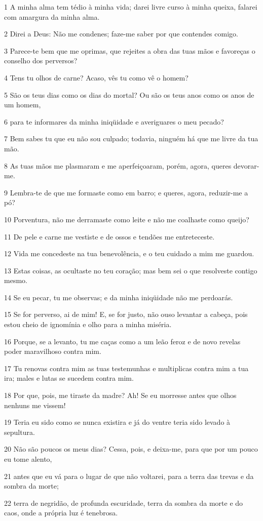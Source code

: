 \par 1 A minha alma tem tédio à minha vida; darei livre curso à minha queixa, falarei com amargura da minha alma.
\par 2 Direi a Deus: Não me condenes; faze-me saber por que contendes comigo.
\par 3 Parece-te bem que me oprimas, que rejeites a obra das tuas mãos e favoreças o conselho dos perversos?
\par 4 Tens tu olhos de carne? Acaso, vês tu como vê o homem?
\par 5 São os teus dias como os dias do mortal? Ou são os teus anos como os anos de um homem,
\par 6 para te informares da minha iniqüidade e averiguares o meu pecado?
\par 7 Bem sabes tu que eu não sou culpado; todavia, ninguém há que me livre da tua mão.
\par 8 As tuas mãos me plasmaram e me aperfeiçoaram, porém, agora, queres devorar-me.
\par 9 Lembra-te de que me formaste como em barro; e queres, agora, reduzir-me a pó?
\par 10 Porventura, não me derramaste como leite e não me coalhaste como queijo?
\par 11 De pele e carne me vestiste e de ossos e tendões me entreteceste.
\par 12 Vida me concedeste na tua benevolência, e o teu cuidado a mim me guardou.
\par 13 Estas coisas, as ocultaste no teu coração; mas bem sei o que resolveste contigo mesmo.
\par 14 Se eu pecar, tu me observas; e da minha iniqüidade não me perdoarás.
\par 15 Se for perverso, ai de mim! E, se for justo, não ouso levantar a cabeça, pois estou cheio de ignomínia e olho para a minha miséria.
\par 16 Porque, se a levanto, tu me caças como a um leão feroz e de novo revelas poder maravilhoso contra mim.
\par 17 Tu renovas contra mim as tuas testemunhas e multiplicas contra mim a tua ira; males e lutas se sucedem contra mim.
\par 18 Por que, pois, me tiraste da madre? Ah! Se eu morresse antes que olhos nenhuns me vissem!
\par 19 Teria eu sido como se nunca existira e já do ventre teria sido levado à sepultura.
\par 20 Não são poucos os meus dias? Cessa, pois, e deixa-me, para que por um pouco eu tome alento,
\par 21 antes que eu vá para o lugar de que não voltarei, para a terra das trevas e da sombra da morte;
\par 22 terra de negridão, de profunda escuridade, terra da sombra da morte e do caos, onde a própria luz é tenebrosa.

